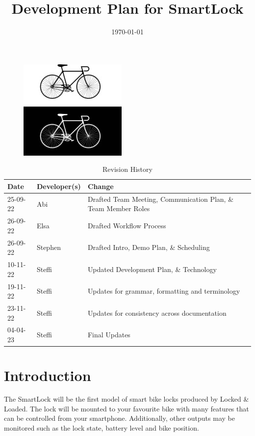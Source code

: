 \documentclass{article}
\title{Development Plan for SmartLock\\\progname}
\author{\authname}
\date{\today}
\begin{document}
\maketitle
\thispagestyle{empty}
\begin{figure}[h!]
  \centering
  \includegraphics[width=0.4\linewidth]{../BikeLogo.jpg}
\end{figure}

\newpage
{}
\begin{table}[hp]
\caption{Revision History} \label{TblRevisionHistory}
\begin{tabularx}{\textwidth}{llX}
\toprule
\textbf{Date} & \textbf{Developer(s)} & \textbf{Change}\\
\midrule
25-09-22 & Abi & Drafted Team Meeting, Communication Plan, \& Team Member Roles\\
26-09-22 & Elsa & Drafted Workflow Process\\
26-09-22 & Stephen & Drafted Intro, Demo Plan, \& Scheduling\\
10-11-22 & Steffi & Updated Development Plan, \& Technology\\
19-11-22 & Steffi & Updates for grammar, formatting and terminology\\
23-11-22 & Steffi & Updates for consistency across documentation\\
04-04-23 & Steffi & Final Updates\\
\bottomrule

\end{tabularx}
\end{table}

\newpage
\tableofcontents
\listoftables

\newpage
{}
\section{Introduction}

The SmartLock will be the first model of smart bike locks produced by Locked \& Loaded. The lock will be mounted to your favourite bike with many features that can be controlled from your smartphone. Additionally, other outputs may be monitored such as the lock state, battery level and bike position.
\end{document}
